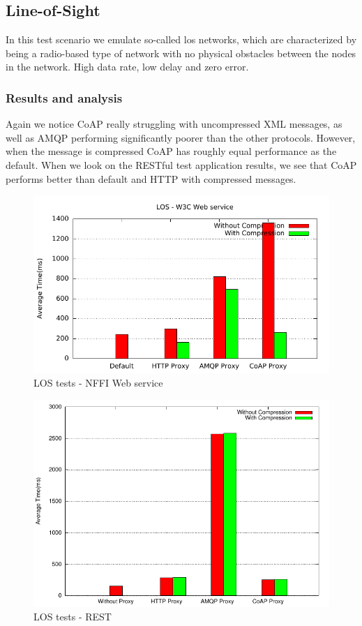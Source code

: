 \subsection{Line-of-Sight}

In this test scenario we emulate so-called \gls{los} networks, which are
characterized by being a radio-based type of network with no physical obstacles
between the nodes in the network. High data rate, low delay and zero error.

\subsubsection{Results and analysis}

Again we notice CoAP really struggling with uncompressed XML messages, as well
as AMQP performing significantly poorer than the other protocols. However,
when the message is compressed CoAP has roughly equal performance as the
default. When we look on the RESTful test application results, we see that
CoAP performs better than default and HTTP with compressed messages.

\begin{figure}[H]
\center
\includegraphics[scale=0.75]{../results/los/nffi/out.pdf}
\caption{LOS tests - NFFI Web service}
\end{figure}

\begin{figure}[H]
\center
\includegraphics[scale=0.75]{../results/los/rest/result.pdf}
\caption{LOS tests - REST}
\end{figure}



